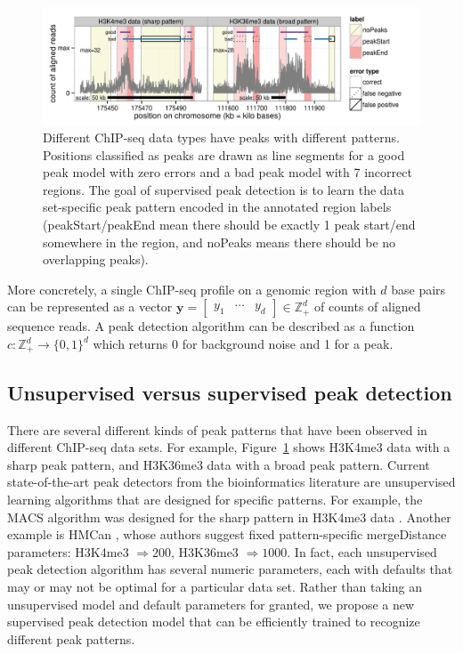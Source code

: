 \documentclass{article}
\newcommand{\ZZ}{\mathbb Z}
\begin{document}
\begin{figure}[b!]
  \centering
  \includegraphics[width=\textwidth]{figure-dp-peaks-train}
  \vskip -0.5cm
  \caption{Different ChIP-seq data types have peaks with different
    patterns. Positions classified as peaks are drawn as line segments
    for a \textcolor{good}{good peak model} with zero errors and a
    \textcolor{bad}{bad peak model} with 7 incorrect regions. The goal
    of supervised peak detection is to learn the data set-specific
    peak pattern encoded in the annotated region labels
    (\colorbox{peakStart}{peakStart}/\colorbox{peakEnd}{peakEnd} mean
    there should be exactly 1 peak start/end somewhere in the region,
    and \colorbox{noPeaks}{noPeaks} means there should be no
    overlapping peaks).}
  \label{fig:dp-peaks-train}
\end{figure}

More concretely, a single ChIP-seq profile on a genomic region with
$d$ base pairs can be represented as a vector $\mathbf y= \left[
  \begin{array}{ccc}
    y_1 & \cdots & y_d
  \end{array}
\right]\in\ZZ_+^d$ of counts of aligned sequence reads. A peak
detection algorithm can be described as a function $c:\ZZ_+^d
\rightarrow \{0, 1\}^d$ which returns 0 for background noise and 1 for
a peak. 

\subsection{Unsupervised versus supervised peak detection}

There are several different kinds of peak patterns that have been
observed in different ChIP-seq data sets. For example,
Figure~\ref{fig:dp-peaks-train} shows H3K4me3 data with a sharp peak
pattern, and H3K36me3 data with a broad peak pattern. Current
state-of-the-art peak detectors from the bioinformatics literature are
unsupervised learning algorithms that are designed for specific
patterns. For example, the MACS algorithm was designed for the sharp
pattern in H3K4me3 data \citep{MACS}. Another example is HMCan
\citep{HMCan}, whose authors suggest fixed pattern-specific
mergeDistance parameters: H3K4me3 $\Rightarrow 200$, H3K36me3
$\Rightarrow 1000$. In fact, each unsupervised peak detection
algorithm has several numeric parameters, each with defaults that may
or may not be optimal for a particular data set. Rather than taking an
unsupervised model and default parameters for granted, we propose a
new supervised peak detection model that can be efficiently trained to
recognize different peak patterns.
\end{document}
